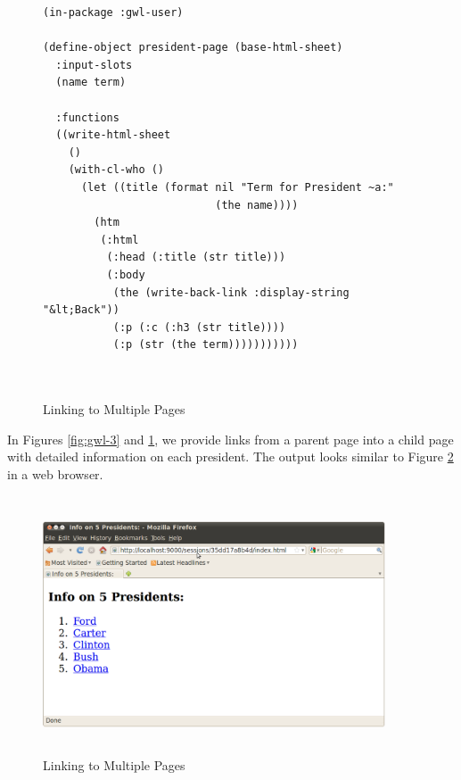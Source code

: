 \documentclass [11pt]{book}
\begin{document}
\begin{figure}
\begin{lrbox}{\boxedverb}
\begin{minipage}{\linewidth}
{\small

\begin{verbatim}(in-package :gwl-user)

(define-object president-page (base-html-sheet)
  :input-slots
  (name term)
  
  :functions
  ((write-html-sheet
    ()
    (with-cl-who ()
      (let ((title (format nil "Term for President ~a:" 
                           (the name))))
        (htm
         (:html 
          (:head (:title (str title)))
          (:body 
           (the (write-back-link :display-string "&lt;Back"))
           (:p (:c (:h3 (str title))))
           (:p (str (the term)))))))))))

      

\end{verbatim}}
\end{minipage}
\end{lrbox}
\fbox{\usebox{\boxedverb}}

\caption{Linking to Multiple Pages}

\label{fig:gwl-3a}

\end{figure}
 In Figures 
\ref{fig:gwl-3} and 
\ref{fig:gwl-3a}, we provide links from a parent page into a child page
with detailed information on each president. The output looks similar
to Figure 
\ref{fig:gwl-3-image} in a web browser.
\begin{figure}
\begin{center}
\includegraphics[width=4in,height=3in]{../images/gwl-3.png}
\end{center}

\caption{Linking to Multiple Pages}

\label{fig:gwl-3-image}

\end{figure}
\end{document}

